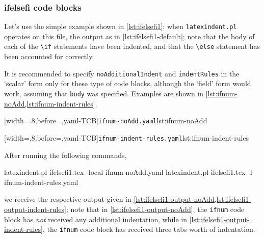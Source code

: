 \subsubsection{ifelsefi code blocks}
Let's use the simple example shown in \cref{lst:ifelsefi1}; when
\texttt{latexindent.pl} operates on this file, the output as in \cref{lst:ifelsefi1-default};
note that the body of each of the \lstinline!\if! statements have been indented, 
and that the \lstinline!\else! statement has been accounted for correctly.

\begin{minipage}{.45\textwidth}
\end{minipage}%
\hfill
\begin{minipage}{.45\textwidth}
\end{minipage}

It is recommended to specify \texttt{noAdditionalIndent} and \texttt{indentRules} in the `scalar' form only 
for these type of code blocks, although the `field' form would work, assuming that \texttt{body} was specified.
Examples are shown in \cref{lst:ifnum-noAdd,lst:ifnum-indent-rules}.

\begin{minipage}{.45\textwidth}
[width=.8\linewidth,before=\centering,yaml-TCB]{\texttt{ifnum-noAdd.yaml}}{lst:ifnum-noAdd}
\end{minipage}
\hfill
\begin{minipage}{.45\textwidth}
[width=.8\linewidth,before=\centering,yaml-TCB]{\texttt{ifnum-indent-rules.yaml}}{lst:ifnum-indent-rules}
\end{minipage}

After running the following commands,
\begin{commandshell}
latexindent.pl ifelsefi1.tex -local ifnum-noAdd.yaml  
latexindent.pl ifelsefi1.tex -l ifnum-indent-rules.yaml  
\end{commandshell}
we receive the respective output given in \cref{lst:ifelsefi1-output-noAdd,lst:ifelsefi1-output-indent-rules}; note that 
in \cref{lst:ifelsefi1-output-noAdd}, the \texttt{ifnum} code block has \emph{not} received any additional indentation, 
while in \cref{lst:ifelsefi1-output-indent-rules}, the \texttt{ifnum} code block has received three tabs worth of indentation.

